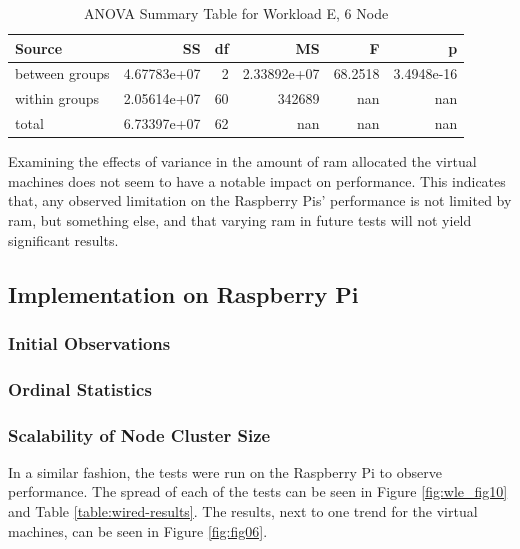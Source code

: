 \begin{table}
\begin{tabular}{lrrrrr}
\toprule
         Source &          SS &  df &          MS &       F &          p \\
\midrule
 between groups & 4.67783e+07 &   2 & 2.33892e+07 & 68.2518 & 3.4948e-16 \\
  within groups & 2.05614e+07 &  60 &      342689 &     nan &        nan \\
          total & 6.73397e+07 &  62 &         nan &     nan &        nan \\
\bottomrule
\end{tabular}
\caption{ANOVA Summary Table for Workload E, 6 Node}
\label{table:ram_variance_analysis_workload_e_6_node}
\end{table}

Examining the effects of variance in the amount of \gls{ram} allocated the virtual machines does not seem to have a notable impact on performance.  This indicates that, any observed limitation on the Raspberry Pis’ performance is not limited by \gls{ram}, but something else, and that varying \gls{ram} in future tests will not yield significant results.


\subsection{Implementation on Raspberry Pi}

\subsubsection{Initial Observations}

\subsubsection{Ordinal Statistics}

\subsubsection{Scalability of Node Cluster Size}

In a similar fashion, the tests were run on the Raspberry Pi to observe performance.  The spread of each of the tests can be seen in Figure \ref{fig:wle_fig10} and Table \ref{table:wired-results}.  The results, next to one trend for the virtual machines, can be seen in Figure \ref{fig:fig06}. 

